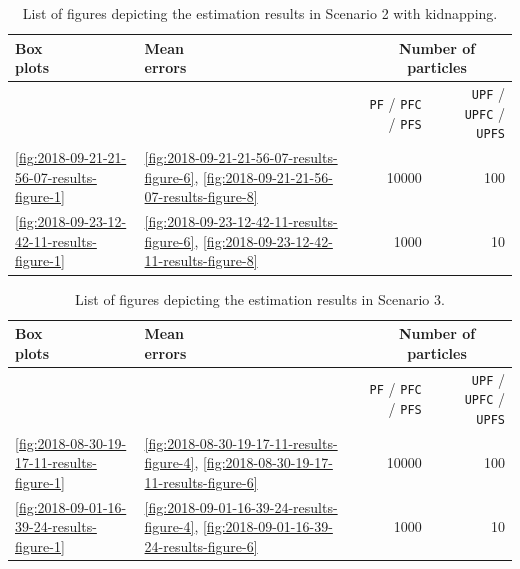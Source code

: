 \begin{table}
\centering
{}\begin{tabular}{@{}llrrrr@{}}
\toprule
\thead{\normalsize Box \\ \normalsize plots} & \thead{\normalsize Mean \\ \normalsize errors} & \phantom{a} & \multicolumn{3}{c}{Number of particles} \\
\midrule
& & & \texttt{PF} / \texttt{PFC} / \texttt{PFS} & \phantom{a} & \texttt{UPF} / \texttt{UPFC} / \texttt{UPFS} \\
\cmidrule{4-4} \cmidrule{6-6}
\ref{fig:2018-09-21-21-56-07-results-figure-1} & \ref{fig:2018-09-21-21-56-07-results-figure-6}, \ref{fig:2018-09-21-21-56-07-results-figure-8} & & 10000 & & 100 \\ 
\ref{fig:2018-09-23-12-42-11-results-figure-1}& \ref{fig:2018-09-23-12-42-11-results-figure-6}, \ref{fig:2018-09-23-12-42-11-results-figure-8} & & 1000 & & 10 \\ 
\bottomrule
\end{tabular}
\caption{List of figures depicting the estimation results in Scenario 2 with kidnapping.}
\label{tab:results_scenario2_kidnapping}
\end{table}

\clearpage


\begin{table}[h!]
\centering
{}\begin{tabular}{@{}llrrrr@{}}
\toprule
\thead{\normalsize Box \\ \normalsize plots} & \thead{\normalsize Mean \\ \normalsize errors} & \phantom{a} & \multicolumn{3}{c}{Number of particles} \\
\midrule
& & & \texttt{PF} / \texttt{PFC} / \texttt{PFS} & \phantom{a} & \texttt{UPF} / \texttt{UPFC} / \texttt{UPFS} \\
\cmidrule{4-4} \cmidrule{6-6}
\ref{fig:2018-08-30-19-17-11-results-figure-1} & \ref{fig:2018-08-30-19-17-11-results-figure-4}, \ref{fig:2018-08-30-19-17-11-results-figure-6} & & 10000 & & 100 \\ 
\ref{fig:2018-09-01-16-39-24-results-figure-1} & \ref{fig:2018-09-01-16-39-24-results-figure-4}, \ref{fig:2018-09-01-16-39-24-results-figure-6} & & 1000 & & 10 \\ 
\bottomrule
\end{tabular}
\caption{List of figures depicting the estimation results in Scenario 3.}
\label{tab:results_scenario3}
\end{table}


